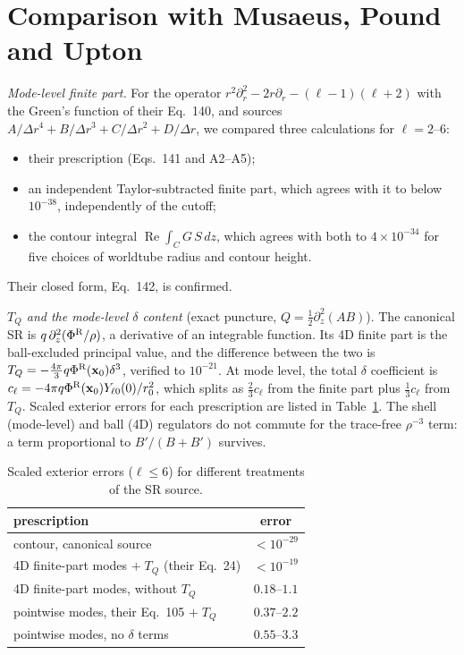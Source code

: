 \documentclass[aps,prl,twocolumn,superscriptaddress,nofootinbib,floatfix]{revtex4-2}
\renewcommand{\Re}{\operatorname{Re}}
\newcommand{\PhiR}{\Phi^{\rm R}}
\newcommand{\x}{\mathbf{x}}
\begin{document}
\section{Comparison with Musaeus, Pound and Upton}\label{app:mpu}
\emph{Mode-level finite part.}
For the operator $r^2\partial_r^2-2r\partial_r-(\ell-1)(\ell+2)$ with the Green's function of their Eq.~140, and sources $A/\Delta r^4+B/\Delta r^3+C/\Delta r^2+D/\Delta r$, we compared three calculations for $\ell=2$--$6$:
\begin{itemize}
\item their prescription (Eqs.~141 and A2--A5);
\item an independent Taylor-subtracted finite part, which agrees with it to below $10^{-38}$, independently of the cutoff;
\item the contour integral $\Re\int_CG\,S\,dz$, which agrees with both to $4\times10^{-34}$ for five choices of worldtube radius and contour height.
\end{itemize}
Their closed form, Eq.~142, is confirmed.

\emph{$T_Q$ and the mode-level $\delta$ content} (exact puncture, $Q=\tfrac12\partial_z^2(AB)$).
The canonical SR is $q\,\partial_z^2(\PhiR/\rho)$, a derivative of an integrable function.
Its 4D finite part is the ball-excluded principal value, and the difference between the two is $T_Q=-\tfrac{4\pi}{3}q\PhiR(\x_0)\delta^3$, verified to $10^{-21}$.
At mode level, the total $\delta$ coefficient is $c_\ell=-4\pi q\PhiR(\x_0)Y_{\ell0}(0)/r_0^2$, which splits as $\tfrac23c_\ell$ from the finite part plus $\tfrac13c_\ell$ from $T_Q$.
Scaled exterior errors for each prescription are listed in Table~\ref{tab:tq}.
The shell (mode-level) and ball (4D) regulators do not commute for the trace-free $\rho^{-3}$ term: a term proportional to $B'/(B+B')$ survives.

\begin{table}[t]
\caption{Scaled exterior errors ($\ell\le6$) for different treatments of the SR source.}
\label{tab:tq}
\begin{ruledtabular}
\begin{tabular}{lc}
prescription & error\\
\hline
contour, canonical source & $<10^{-29}$\\
4D finite-part modes $+\;T_Q$ (their Eq.~24) & $<10^{-19}$\\
4D finite-part modes, without $T_Q$ & $0.18$--$1.1$\\
pointwise modes, their Eq.~105 $+\;T_Q$ & $0.37$--$2.2$\\
pointwise modes, no $\delta$ terms & $0.55$--$3.3$\\
\end{tabular}
\end{ruledtabular}
\end{table}
\end{document}
